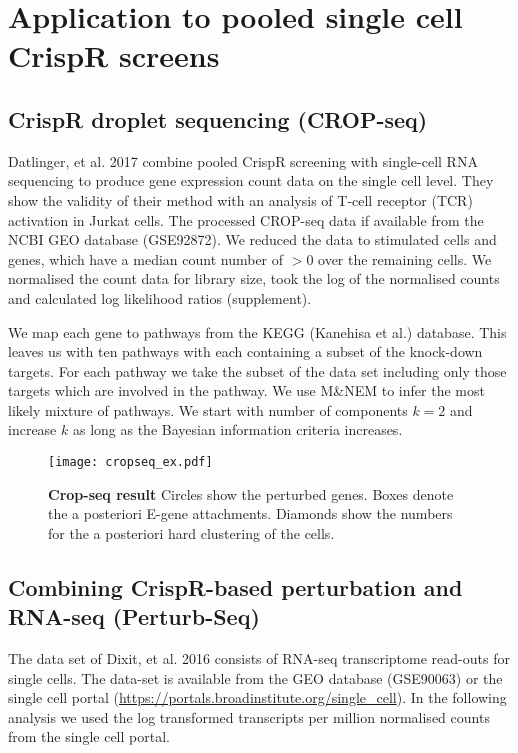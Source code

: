 \documentclass[12pt]{article}
\begin{document}
\section{Application to pooled single cell CrispR screens}

\subsection{CrispR droplet sequencing (CROP-seq)}

Datlinger, et al. 2017 combine pooled CrispR screening with single-cell RNA sequencing to produce gene expression count data on the single cell level. They show the validity of their method with an analysis of T-cell receptor (TCR) activation in Jurkat cells. The processed CROP-seq data if available from the NCBI GEO database (GSE92872). We reduced the data to stimulated cells and genes, which have a median count number of $> 0$ over the remaining cells. We normalised the count data for library size, took the log of the normalised counts and calculated log likelihood ratios (supplement).

We map each gene to pathways from the KEGG (Kanehisa et al.) database. This leaves us with ten pathways with each containing a subset of the knock-down targets. For each pathway we take the subset of the data set including only those targets which are involved in the pathway. We use M\&NEM to infer the most likely mixture of pathways. We start with number of components $k=2$ and increase $k$ as long as the Bayesian information criteria increases. 

\begin{figure}
\texttt{[image: cropseq\_ex.pdf]}
\caption{\textbf{Crop-seq result} Circles show the perturbed genes. Boxes denote the a posteriori E-gene attachments. Diamonds show the numbers for the a posteriori hard clustering of the cells. }\label{fig:cropseq}
\end{figure}

\subsection{Combining CrispR-based perturbation and RNA-seq (Perturb-Seq)}

The data set of Dixit, et al. 2016 consists of RNA-seq transcriptome read-outs for single cells. The data-set is available from the GEO database (GSE90063) or the single cell portal (\url{https://portals.broadinstitute.org/single_cell}). In the following analysis we used the log transformed transcripts per million normalised counts from the single cell portal. 
\end{document}
